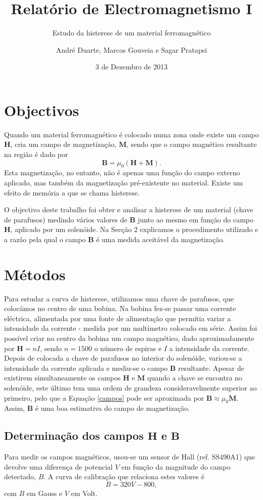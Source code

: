 \documentclass[a4paper]{article}
\title{Relatório de Electromagnetismo I}
\subtitle{Estudo da histerese de um material ferromagnético}
\author{André Duarte, Marcos Gouveia e Sagar Pratapsi}
\date{3 de Dezembro de 2013}
\begin{document}
\maketitle

\section{Objectivos}
Quando um material ferromagnético é colocado numa zona onde existe um campo $\mathbf{H}$, cria um campo de magnetização, $\mathbf{M}$, sendo que o campo magnético resultante na região é dado por \begin{equation}\label{campos} \mathbf{B}=\mu_0\left( \mathbf{H}+\mathbf{M}\right).\end{equation} Esta magnetização, no entanto, não é apenas uma função do campo externo aplicado, mas também da magnetização pré-existente no material. Existe um efeito de memória a que se chama histerese. 

O objectivo deste trabalho foi obter e analisar a histerese de um material (chave de parafusos) medindo vários valores de $\mathbf{B}$ junto ao mesmo em função do campo $\mathbf{H}$, aplicado por um solenóide. Na Secção 2 explicamos o procedimento utilizado e a razão pela qual o campo $\mathbf{B}$ é uma medida aceitável da magnetização.
\section{Métodos}
Para estudar a curva de histerese, utilizamos uma chave de parafusos, que colocámos no centro de uma bobina. Na bobina fez-se passar uma corrente eléctrica, alimentada por uma fonte de alimentação que permitia variar a intensidade da corrente - medida por um multímetro colocado em série. Assim foi possível criar no centro da bobina um campo magnético, dado aproximadamente por $\mathbf{H}=nI$, sendo $n=1500$ o número de espiras e $I$ a intensidade da corrente. Depois de colocada a chave de parafusos no interior do solenóide, variou-se a intensidade da corrente aplicada e mediu-se o campo $\mathbf{B}$ resultante. Apesar de existirem simultaneamente os campos $\mathbf{H}$ e $\mathbf{M}$ quando a chave se encontra no solenóide, este último tem uma ordem de grandeza consideravelmente superior ao primeiro, pelo que a Equação \ref{campos} pode ser aproximada por $\mathbf{B} \approx \mu_0 \mathbf{M}$. Assim, $\mathbf{B}$ é uma boa estimativa do campo de magnetização.

\subsection{Determinação dos campos $ \mathbf{H}$ e $ \mathbf{B}$}
Para medir os campos magnéticos, usou-se um sensor de Hall (ref. SS490A1) que devolve uma diferença de potencial $V$ em função da magnitude do campo detectado, $B$. A curva de calibração que relaciona estes valores é \begin{equation}\label{calibracao}B=320V-800,\end{equation}
com $B$ em Gauss e $V$ em Volt.
\end{document}
